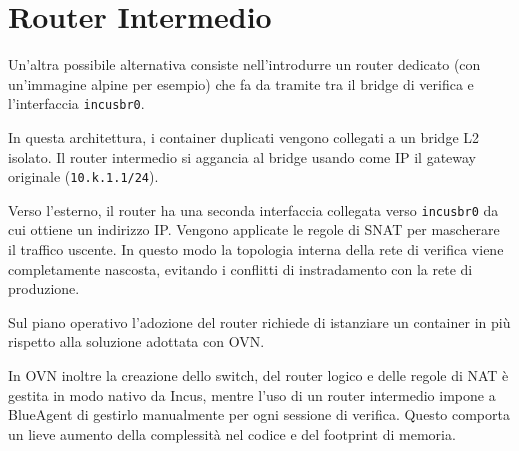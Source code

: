 \section{Router Intermedio}\label{router-intermedio}

Un'altra possibile alternativa consiste nell'introdurre un router
dedicato (con un'immagine alpine per esempio) che fa da tramite tra il
bridge di verifica e l'interfaccia \passthrough{\lstinline!incusbr0!}.

In questa architettura, i container duplicati vengono collegati a un
bridge L2 isolato. Il router intermedio si aggancia al bridge usando
come IP il gateway originale (\passthrough{\lstinline!10.k.1.1/24!}).

Verso l'esterno, il router ha una seconda interfaccia collegata verso
\passthrough{\lstinline!incusbr0!} da cui ottiene un indirizzo IP.
Vengono applicate le regole di SNAT per mascherare il traffico uscente.
In questo modo la topologia interna della rete di verifica viene
completamente nascosta, evitando i conflitti di instradamento con la
rete di produzione.

Sul piano operativo l'adozione del router richiede di istanziare un
container in più rispetto alla soluzione adottata con OVN.

In OVN inoltre la creazione dello switch, del router logico e delle
regole di NAT è gestita in modo nativo da Incus, mentre l'uso di un
router intermedio impone a BlueAgent di gestirlo manualmente per ogni
sessione di verifica. Questo comporta un lieve aumento della complessità
nel codice e del footprint di memoria.
